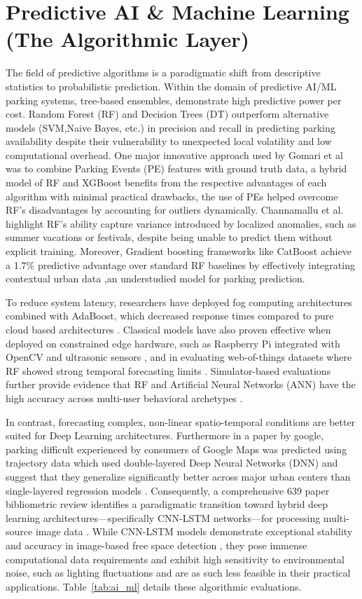 \documentclass[conference]{IEEEtran}
\begin{document}
\section{Predictive AI \& Machine Learning (The Algorithmic Layer)}
The field of predictive algorithms is a paradigmatic shift from descriptive statistics to probabilistic prediction. Within the domain of predictive AI/ML parking systems, tree-based ensembles, demonstrate high predictive power per cost. Random Forest (RF) and Decision Trees (DT) outperform alternative models (SVM,Naive Bayes, etc.) in precision and recall in predicting parking availability despite their vulnerability to unexpected local volatility and low computational overhead\cite{b21,b6,b29}. One major innovative approach used by Gomari et al \cite{b12} was to combine Parking Events (PE) features with ground truth data, a hybrid model of RF and XGBoost benefits from the respective advantages of each algorithm with minimal practical drawbacks, the use of PEs helped overcome RF's disadvantages by accounting for outliers dynamically. Channamallu et al. \cite{b14} highlight RF's ability capture variance introduced by localized anomalies, such as summer vacations or festivals, despite being unable to predict them without explicit training. Moreover, Gradient boosting frameworks like CatBoost achieve a 1.7\% predictive advantage over standard RF baselines by effectively integrating contextual urban data \cite{b10},an understudied model for parking prediction. 

To reduce system latency, researchers have deployed fog computing architectures combined with AdaBoost, which decreased response times compared to pure cloud based architectures \cite{b35}. Classical models have also proven effective when deployed on constrained edge hardware, such as Raspberry Pi integrated with OpenCV and ultrasonic sensors \cite{b28}, and in evaluating web-of-things datasets where RF showed strong temporal forecasting limits \cite{b30}. Simulator-based evaluations further provide evidence that RF and Artificial Neural Networks (ANN) have the high accuracy across multi-user behavioral archetypes \cite{b16}.

In contrast, forecasting complex, non-linear spatio-temporal conditions are better suited for Deep Learning architectures. Furthermore in a paper by google, parking difficult experienced by consumers of Google Maps was predicted using trajectory data which used double-layered Deep Neural Networks (DNN) and suggest that they generalize significantly better across major urban centers than single-layered regression models \cite{b18}. Consequently, a comprehensive 639 paper bibliometric review identifies a paradigmatic transition toward hybrid deep learning architectures—specifically CNN-LSTM networks—for processing multi-source image data \cite{b5}. While CNN-LSTM models demonstrate exceptional stability and accuracy in image-based free space detection \cite{b32}, they pose immense computational data requirements and exhibit high sensitivity to environmental noise, such as lighting fluctuations and are as such less feasible in their practical applications. Table~\ref{tab:ai_ml} details these algorithmic evaluations.
\end{document}
